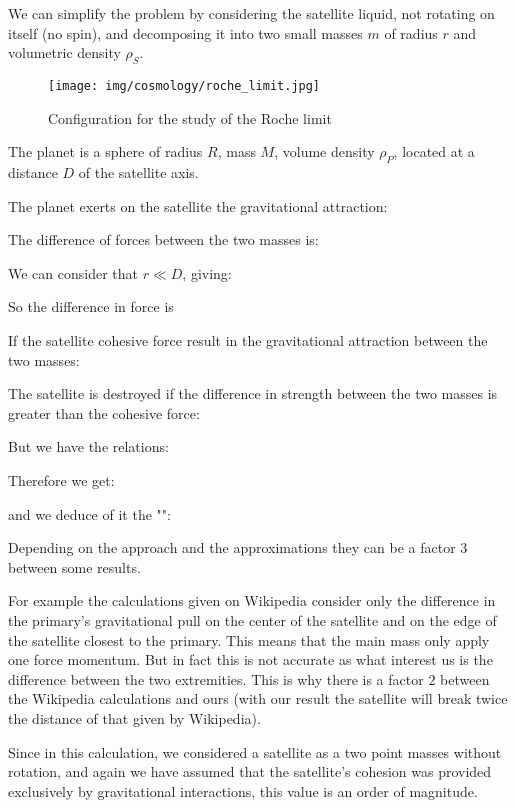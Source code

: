 	We can simplify the problem by considering the satellite liquid, not rotating on itself (no spin), and decomposing it into two small masses $m$ of radius $r$ and volumetric density $\rho_S$.
	\begin{figure}[H]
		\centering
		\texttt{[image: img/cosmology/roche\_limit.jpg]}	
		\caption{Configuration for the study of the Roche limit}
	\end{figure}
	The planet is a sphere of radius $R$, mass $M$,  volume density $\rho_P$, located at a distance $D$ of the satellite axis.
	
	The planet exerts on the satellite the gravitational attraction:
	
	The difference of forces between the two masses is:
	
	We can consider that $r \ll D$, giving:
	
	So the difference in force is
	
	If the satellite cohesive force result in the gravitational attraction between the two masses:
	
	The satellite is destroyed if the difference in strength between the two masses is greater than the cohesive force:
	
	But we have the relations:
	
	Therefore we get:
	
	and we deduce of it the "":
	
	Depending on the approach and the approximations they can be a factor $3$ between some results.
	\begin{tcolorbox}[title=Remark,colframe=black,arc=10pt]
	For example the calculations given on Wikipedia consider only the difference in the primary's gravitational pull on the center of the satellite and on the edge of the satellite closest to the primary. This means that the main mass only apply one force momentum. But in fact this is not accurate as what interest us is the difference between the two extremities. This is why there is a factor $2$ between the Wikipedia calculations and ours (with our result the satellite will break twice the distance of that given by Wikipedia).
	\end{tcolorbox}
	
	Since in this calculation, we considered a satellite as a two point masses without rotation, and again we have assumed that the satellite's cohesion was provided exclusively by gravitational interactions, this value is an order of magnitude.
	
